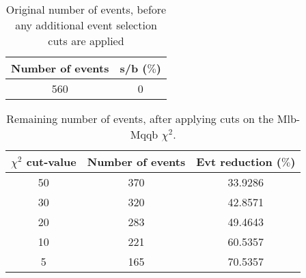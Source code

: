 \documentclass{article}
\begin{document}
 

 \begin{abstract} 
 
   The tables in this document represent the influence of the additional event selection cuts that were applied in order to reduce the number of selected events for CPU reasons. \\ 
   The considered cuts are rather basic and are merely developed to reduce the number of so-called wrong events \\ 
   \begin{itemize} 
     \item Cut on Mlb-Mqqb $\chi^{2}$ distribution 
     \item Cut on top and W-mass window 
   \end{itemize} 
 
   \textbf{Created on :} \today 
 \end{abstract} 
 
 \begin{table}[h!t] 
  \caption{Original number of events, before any additional event selection cuts are applied} 
  \centering 
   \begin{tabular}{c|c} 
     Number of events    & s/b ($\%$)     \\ 
     \hline
     560  & 0 
 
   \end{tabular} 
 \end{table} 
 
 \begin{table}[h!t] 
  \caption{Remaining number of events, after applying cuts on the Mlb-Mqqb $\chi^{2}$.} 
  \centering 
   \begin{tabular}{c|c|c|} 
     $\chi^{2}$ cut-value    & Number of events  & Evt reduction ($\%$)    \\ 
     \hline
     50  &   370  &  33.9286 \\ 
     30  &   320  &  42.8571 \\ 
     20  &   283  &  49.4643 \\ 
     10  &   221  &  60.5357 \\ 
     5  &   165  &  70.5357 \\ 
   \end{tabular} 
 \end{table} 
 
\end{document}
